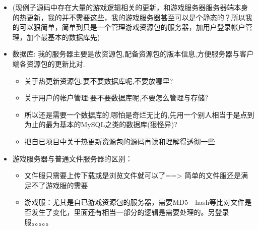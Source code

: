 \documentclass[9pt, b5paper]{article}
\begin{document}
\begin{itemize}
\begin{itemize}
\end{itemize}
\item (现例子源码中存在大量的游戏逻辑相关的更新，和游戏服务器服务器端本身的热更新，我的并不需要这些，我的游戏服务器甚至可以是个静态的？所以我的可以狠简单，简单到只是一个管理游戏资源包的服务器，加用户登录帐户管理，加个最基本的数据库先)
\item 数据库: 我的服务器主要是放资源包,配备资源包的版本信息,方便服务器与客户端各资源包的更新比对.
\begin{itemize}
\item 关于热更新资源包:要不要数据库呢,不要放哪里?
\item 关于用户的帐户管理:要不要数据库呢,不要怎么管理与存储?
\item 所以还是需要一个数据库的,哪怕是奇烂无比的,先用一个别人相当于是点到为止的最为基本的MySQL之类的数据库(狠怪异)?
\item 把自已项目中关于热更新资源包的源码再读和理解得透彻一些
\end{itemize}
\item 游戏服务器与普通文件服务器的区别：
\begin{itemize}
\item 文件服只需要上传下载或是浏览文件就可以了==> 简单的文件服还是满足不了游戏服的需要
\item 游戏服：尤其是自已游戏资源包的服务器，需要MD5　hash等比对文件是否发生了变化，里面还有相当一部分的逻辑是需要处理的。另登录服。。。。。
\end{itemize}
\end{itemize}
\end{document}
